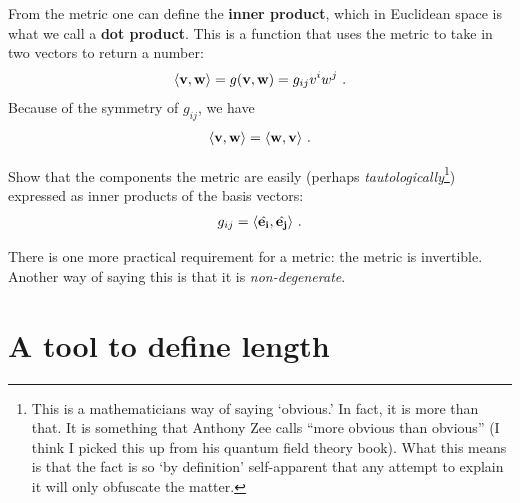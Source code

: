 \documentclass[12pt, oneside]{report}    %
\let\oldsection\section
\def\section{%
  \setcounter{sidenote}{1}%
  \oldsection
}
\begin{document}
From the metric one can define the \textbf{inner product}, which in Euclidean space is what we call a \textbf{dot product}. This is a function that uses the metric to take in two vectors to return a number:
\begin{align}
    \langle \mathbf{v},\mathbf{w} \rangle = g(\mathbf{v},\mathbf{w})
    = g_{ij} v^i w^j \ .
\end{align}
Because of the symmetry of $g_{ij}$, we have
\begin{align}
    \langle \mathbf{v}, \mathbf{w} \rangle = \langle \mathbf{w}, \mathbf{v} \rangle \ .
\end{align}



\begin{exercise}
Show that the components the metric are easily (perhaps \emph{tautologically}\footnote{This is a mathematicians way of saying `obvious.' In fact, it is more than that. It is something that Anthony Zee calls ``more obvious than obvious'' (I think I picked this up from his quantum field theory book). What this means is that the fact is so `by definition' self-apparent that any attempt to explain it will only obfuscate the matter.}) expressed as inner products of the basis vectors:
\begin{align}
    g_{ij} = \langle \hat{\mathbf{e_i}}, \hat{\mathbf{e_j}}\rangle \ .
\end{align}
\end{exercise}

There is one more practical requirement for a metric: the metric is invertible. Another way of saying this is that it is \emph{non-degenerate}. 

\section{A tool to define length}
\label{sec:machine:to:make:row:vectors}
\end{document}
